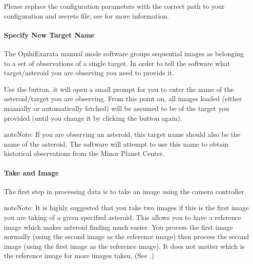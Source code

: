 \documentclass[letterpaper,11pt,english]{sphinxmanual}
\begin{document}
\begin{sphinxVerbatim}[commandchars=\\\{\}]
   
\end{sphinxVerbatim}

\sphinxAtStartPar
Please replace the configuration parameters with the correct path to your
configuration and secrets file; see {\hyperref[\detokenize{user/configuration:user-configuration}]{}} for more
information.


\paragraph{Specify New Target Name}
\label{\detokenize{user/manual_mode:specify-new-target-name}}\label{\detokenize{user/manual_mode:user-manual-mode-procedure-specify-new-target-name}}
\sphinxAtStartPar
The OpihiExarata manual mode software groups sequential images as belonging to
a set of observations of a single target. In order to tell the software what
target/asteroid you are observing you need to provide it.

\sphinxAtStartPar
Use the  button, it will open a small prompt for you to enter the
name of the asteroid/target you are observing. From this point on, all images
loaded (either manually or automatically fetched) will be assumed to be of the
target you provided (until you change it by clicking the button again).

\begin{sphinxadmonition}{note}{Note:}
\sphinxAtStartPar
If you are observing an asteroid, this target name should also be the name
of the asteroid. The software will attempt to use this name to obtain
historical observations from the Minor Planet Center.
\end{sphinxadmonition}


\paragraph{Take and Image}
\label{\detokenize{user/manual_mode:take-and-image}}
\sphinxAtStartPar
The first step in processing data is to take an image using the camera
controller.

\begin{sphinxadmonition}{note}{Note:}
\sphinxAtStartPar
It is highly suggested that you take two images if this is the first image
you are taking of a given specified asteroid. This allows you to have a
reference image which makes asteroid finding much easier. You process the
first image normally (using the second image as the reference image) then
process the second image (using the first image as the reference image).
It does not matter which is the reference image for more images taken. (See
{\hyperref[\detokenize{user/manual_mode:user-manual-mode-procedure-find-asteroid-location}]{}}.)
\end{sphinxadmonition}
\end{document}
